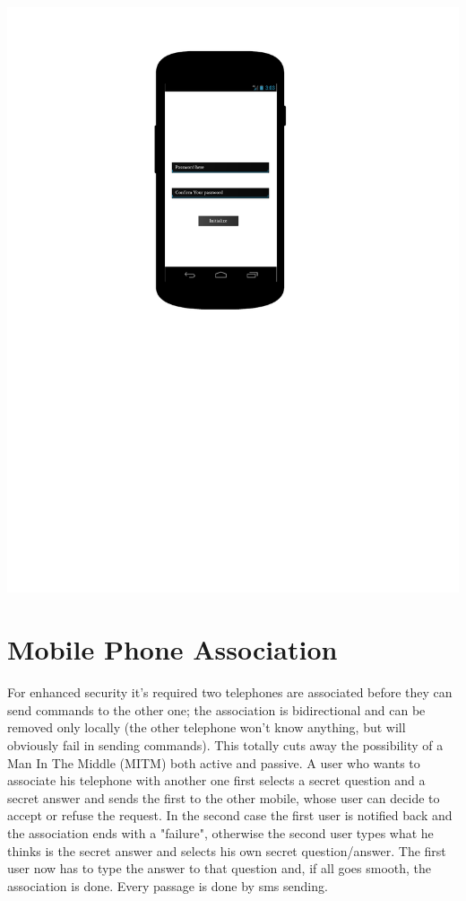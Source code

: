 \includegraphics[scale=0.7]{images/initialization_design}


\section{Mobile Phone Association}
For enhanced security it’s required two telephones are associated before they
can send commands to the other one; the association is bidirectional and can
be removed only locally (the other telephone won’t know anything, but will
obviously fail in sending commands). This totally cuts away the possibility of
a Man In The Middle (MITM) both active and passive. A user who wants
to associate his telephone with another one first selects a secret question
and a secret answer and sends the first to the other mobile, whose user can
decide to accept or refuse the request. In the second case the first user is
notified back and the association ends with a "failure", otherwise the second
user types what he thinks is the secret answer and selects his own secret
question/answer. The first user now has to type the answer to that question
and, if all goes smooth, the association is done. Every passage is done by
sms sending.

